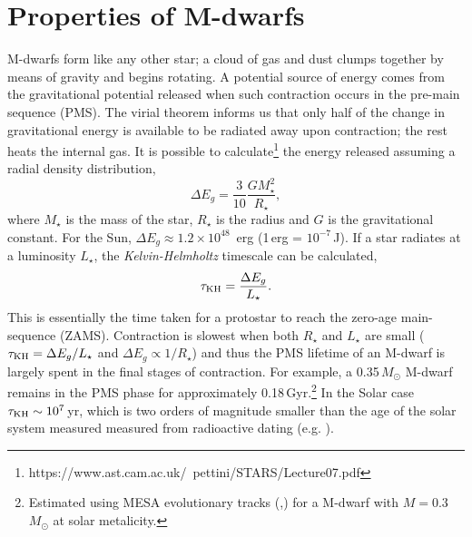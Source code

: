 \section{Properties of M-dwarfs}

 M-dwarfs form like any other star; a cloud of gas and dust clumps together by means of gravity and begins rotating. A potential source of energy comes from the gravitational potential released when such contraction occurs in the pre-main sequence (PMS). The virial theorem informs us that only half of the change in gravitational energy is available to be radiated away upon contraction; the rest heats the internal gas. It is possible to calculate\footnote{https://www.ast.cam.ac.uk/~pettini/STARS/Lecture07.pdf} the energy released assuming a radial density distribution,
%
\begin{equation}\label{virial_energy}
    \Delta E_g = \frac{3}{10} \frac{G M_\star^2}{R_\star},
\end{equation}
%
where $M_\star$ is the mass of the star, $R_\star$ is the radius and $G$ is the gravitational constant. For the Sun, $\Delta E_g \approx 1.2 \times 10^{48}$\, erg (1\,erg = $10^{-7}$\,J). If a star radiates at a luminosity $L_\star$, the \textit{Kelvin-Helmholtz} timescale can be calculated,
%
\begin{equation}\label{kelvin_helmholtz_timescale}
    \tau_{\rm KH} = \frac{\Delta E_g}{L_\star}.
\end{equation}
%
This is essentially the time taken for a protostar to reach the zero-age main-sequence (ZAMS). Contraction is slowest when both $R_\star$ and $L_\star$ are small ($\tau_{\rm KH} = \Delta E_g / L_\star$ and $\Delta E_g \propto 1/R_\star$) and thus the PMS lifetime of an M-dwarf is largely spent in the final stages of contraction. For example, a 0.35\,$M_\odot$ M-dwarf remains in the PMS phase for approximately 0.18\,Gyr.\footnote{Estimated using MESA evolutionary tracks (\citealt{2016ApJS..222....8D},\citealt{2016ApJ...823..102C}) for a M-dwarf with $M = 0.3$\,$M_\odot$ at solar metalicity.} In the Solar case $\tau_{\rm KH} \sim  10^{7}$\,yr, which is two orders of magnitude smaller than the age of the solar system measured measured from radioactive dating (e.g. \citealt{2005Natur.436.1127B}).

